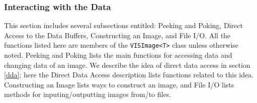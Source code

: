 \subsubsection{Interacting with the Data}
\label{il_iwtd}
This section includes several subsections entitled:
Peeking and Poking, Direct Access to the Data Buffers, Constructing an Image,
and File I/O.  All the functions listed here are members of the
{\tt VISImage<T>} class unless otherwise noted.
Peeking and Poking lists the main functions
for accessing data and changing data of an image.
We describe the idea of direct data access in section \ref{dda};
here the Direct Data Access description lists functions
related to this idea.
Constructing an Image lists ways to construct an image,
and File I/O lists methods for inputing/outputting images
from/to files.

